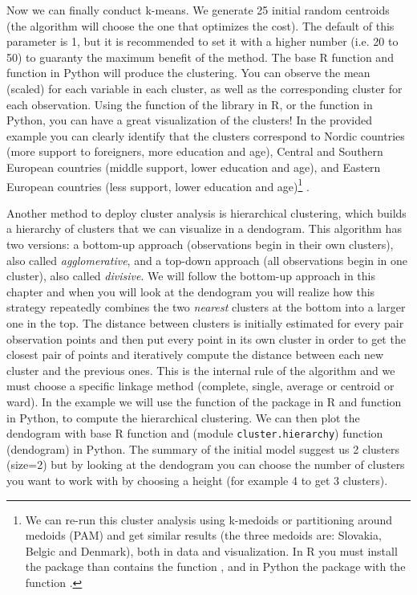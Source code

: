 Now we can finally conduct k-means. We generate 25 initial random centroids (the algorithm will choose the one that optimizes the cost). The default of this parameter is 1, but it is recommended to set it with a higher number (i.e. 20 to 50) to guaranty the maximum benefit of the method. The base R function  and  function  in Python will produce the clustering. You can observe the mean (scaled) for each variable in each cluster, as well as the corresponding cluster for each observation. Using the function  of the library  in R, or the  function  in Python, you can have a great visualization of the clusters! In the provided example you can clearly identify that the clusters correspond to Nordic countries (more support to foreigners, more education and age), Central and Southern European countries (middle support, lower education and age), and Eastern European countries (less support, lower education and age)\footnote{We can re-run this cluster analysis using k-medoids or partitioning around medoids (PAM) and get similar results (the three medoids are: Slovakia, Belgic and Denmark), both in data and visualization. In R you must install the package  than contains the function , and in Python the package  with the function .} .


Another method to deploy cluster analysis is hierarchical clustering, which builds a hierarchy of clusters that we can visualize in a dendogram.  This algorithm has two versions: a bottom-up approach (observations begin in their own clusters), also called \textit{agglomerative}, and a top-down approach (all observations begin in one cluster), also called \textit{divisive}. We will follow the bottom-up approach in this chapter and when you will look at the dendogram you will realize how this strategy repeatedly combines the two \textit{nearest} clusters at the bottom into a larger one in the top. The distance between clusters is initially estimated for every pair observation points and then put every point in its own cluster in order to get the closest pair of points and iteratively compute the distance between each new cluster and the previous ones. This is the internal rule of the algorithm and we must choose a specific linkage method (complete, single, average or centroid or ward). In the example we will use the function  of the package  in R and  function  in Python, to compute the hierarchical clustering. We can then plot the dendogram  with base R function  and  (module \texttt{cluster.hierarchy}) function \fn(dendogram) in Python. The summary of the initial model suggest us 2 clusters (size=2) but by looking at the dendogram you can choose the number of clusters you want to work with by choosing a height (for example 4 to get 3 clusters). 

